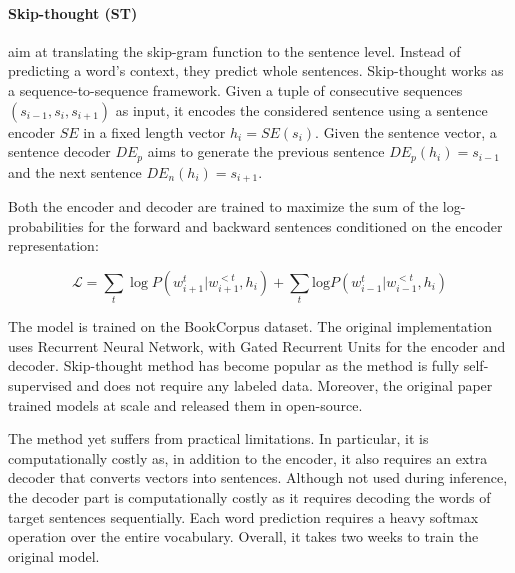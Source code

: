

\paragraph{Skip-thought (ST)} \textcite{kiros_15} aim at translating the skip-gram function to the sentence level. Instead of predicting a word's context, they predict whole sentences. Skip-thought works as a sequence-to-sequence framework. Given a tuple of consecutive sequences $(s_{i-1}, s_i, s_{i+1})$ as input, it encodes the considered sentence using a sentence encoder $SE$ in a fixed length vector $h_i = SE(s_i)$. Given the sentence vector, a sentence decoder $DE_p$ aims to generate the previous sentence $DE_p(h_i) = s_{i-1}$ and the next sentence $DE_n(h_i) = s_{i+1}$.

Both the encoder and decoder are trained to maximize the sum of the log-probabilities for the forward and backward sentences conditioned on the encoder representation:

\begin{equation*}
    \mathcal{L} = \sum_t \log P(w_{i+1}^t | w_{i+1}^{<t}, h_i) + \sum_t \text{log} P(w_{i-1}^t | w_{i-1}^{<t}, h_i)
\end{equation*}

The model is trained on the BookCorpus dataset. The original implementation uses Recurrent Neural Network, with Gated Recurrent Units \parencite{cho_14} for the encoder and decoder. Skip-thought method has become popular as the method is fully self-supervised and does not require any labeled data. Moreover, the original paper trained models at scale and released them in open-source. 

The method yet suffers from practical limitations. In particular, it is computationally costly as, in addition to the encoder, it also requires an extra decoder that converts vectors into sentences. Although not used during inference, the decoder part is computationally costly as it requires decoding the words of target sentences sequentially. Each word prediction requires a heavy softmax operation over the entire vocabulary. Overall, it takes two weeks to train the original model.


